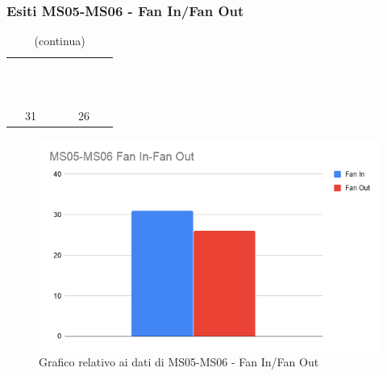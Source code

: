 \subsubsection{Esiti MS05-MS06 - Fan In/Fan Out}
\begin{longtable}{c c}
\rowcolor{white}\caption{Esiti MS05-MS06} \\
	\rowcolor{redafk}
	\textcolor{white}{\textbf{Fan In}} &
	\textcolor{white}{\textbf{Fan Out}}\\
	\endfirsthead
		\rowcolor{white}\caption[]{(continua)} \\
		\rowcolor{redafk}
	\textcolor{white}{\textbf{Fan In}} &
	\textcolor{white}{\textbf{Fan Out}}\\
	\endhead
	31 & 26\\	
\end{longtable}

\begin{figure}[H]
\centering
\includegraphics[scale=0.45]{./img/MS05-MS06.png}
\caption{Grafico relativo ai dati di MS05-MS06 - Fan In/Fan Out}
\end{figure}




